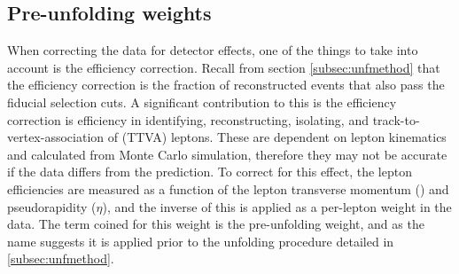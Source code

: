 \subsection{Pre-unfolding weights}
\label{subsec:preuf}

When correcting the data for detector effects, one of the things to take into account is the efficiency correction. Recall from section \ref{subsec:unfmethod} that the efficiency correction is the fraction of reconstructed events that also pass the fiducial selection cuts. A significant contribution to this is the efficiency correction is efficiency in identifying, reconstructing, isolating, and track-to-vertex-association of (TTVA) leptons. These are dependent on lepton kinematics and calculated from Monte Carlo simulation, therefore they may not be accurate if the data differs from the prediction. To correct for this effect, the lepton efficiencies are measured as a function of the lepton transverse momentum (\pT) and pseudorapidity ($\eta$), and the inverse of this is applied as a per-lepton weight in the data. The term coined for this weight is the pre-unfolding weight, and as the name suggests it is applied prior to the unfolding procedure detailed in \ref{subsec:unfmethod}. 

